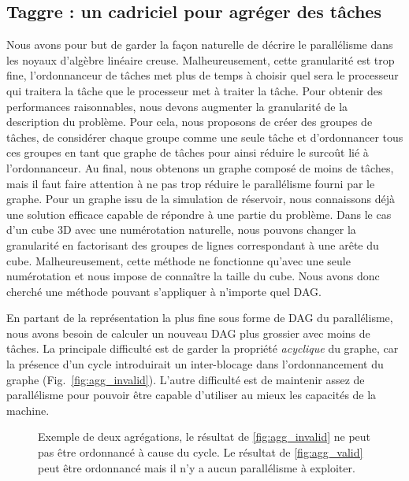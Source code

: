 \subsection{Taggre : un cadriciel pour agréger des tâches}
Nous avons pour but de garder la façon naturelle de décrire le parallélisme dans les noyaux d'algèbre linéaire creuse.
%
Malheureusement, cette granularité est trop fine, l'ordonnanceur de tâches met plus de temps à choisir quel sera le processeur qui traitera la tâche que le processeur met à traiter la tâche.
%
Pour obtenir des performances raisonnables, nous devons augmenter la granularité de la description du problème.
%
Pour cela, nous proposons de créer des groupes de tâches, de considérer chaque groupe comme une seule tâche et d'ordonnancer tous ces groupes en tant que graphe de tâches pour ainsi réduire le surcoût lié à l'ordonnanceur.
%
Au final, nous obtenons un graphe composé de moins de tâches, mais il faut faire attention à ne pas trop réduire le parallélisme fourni par le graphe.
%
Pour un graphe issu de la simulation de réservoir, nous connaissons déjà une solution efficace capable de répondre à une partie du problème.
%
Dans le cas d'un cube 3D avec une numérotation naturelle, nous pouvons changer la granularité en factorisant des groupes de lignes correspondant à une arête du cube.
%
Malheureusement, cette méthode ne fonctionne qu'avec une seule numérotation et nous impose de connaître la taille du cube.
%
Nous avons donc cherché une méthode pouvant s'appliquer à n'importe quel DAG.



En partant de la représentation la plus fine sous forme de DAG du parallélisme, nous avons besoin de calculer un nouveau DAG plus grossier avec moins de tâches.
%
La principale difficulté est de garder la propriété {\em acyclique} du graphe, car la présence d'un cycle introduirait un inter-blocage dans l'ordonnancement du graphe (Fig.~\ref{fig:agg_invalid}).
%
L'autre difficulté est de maintenir assez de parallélisme pour pouvoir être capable d'utiliser au mieux les capacités de la machine.

\begin{figure}[!ht]
     \begin{center}
        \hspace{0.15\textwidth}%
    \end{center}
    \caption{Exemple de deux agrégations, le résultat de \ref{fig:agg_invalid} ne peut pas être ordonnancé à cause du cycle. Le résultat de \ref{fig:agg_valid} peut être ordonnancé mais il n'y a aucun parallélisme à exploiter.}
    \label{fig:agg_basic}
\end{figure}

